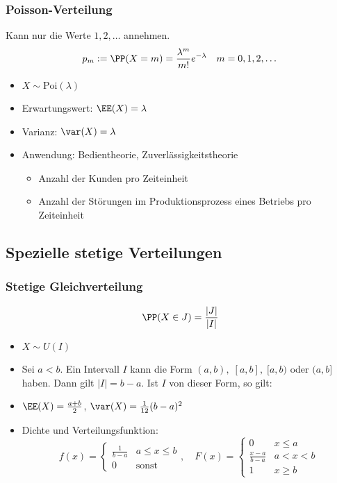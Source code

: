 \documentclass{scrreprt}
\begin{document}
\subsubsection{Poisson-Verteilung}
Kann nur die Werte $1,2,\dots$ annehmen.
$$p_m:=\PP(X=m)=\frac{\lambda^m}{m!}e^{-\lambda} \quad m=0,1,2,\dots$$
\begin{itemize}
\item $X\sim \mathrm{Poi}(\lambda)$
\item Erwartungswert: $\EE(X)=\lambda$
\item Varianz: $\var(X)=\lambda$
\item Anwendung: Bedientheorie, Zuverlässigkeitstheorie
\begin{itemize}
\item Anzahl der Kunden pro Zeiteinheit
\item Anzahl der Störungen im Produktionsprozess eines Betriebs pro Zeiteinheit
\end{itemize}
\end{itemize}

\subsection{Spezielle stetige Verteilungen}

\subsubsection{Stetige Gleichverteilung}

$$\PP(X\in J)=\frac{|J|}{|I|}$$
\begin{itemize}
\item $X \sim U(I)$
\item Sei $a<b$. Ein Intervall $I$ kann die Form $(a,b),\;[a,b],\;[a,b)$ oder $(a,b]$ haben. Dann gilt $|I|=b-a$. Ist $I$ von dieser Form, so gilt:
\item $\EE(X)=\frac{a+b}{2}$, $\var(X)=\frac{1}{12}(b-a)^2$
\item Dichte und Verteilungsfunktion:
$$f(x)=\begin{cases}
\frac{1}{b-a} & a\leq x \leq b\\
0 & \mathrm{sonst}
\end{cases}, \quad F(x)=\begin{cases}
0 & x \leq a\\
\frac{x-a}{b-a} & a<x<b\\
1 & x \geq b
\end{cases}$$
\end{itemize}
\end{document}
